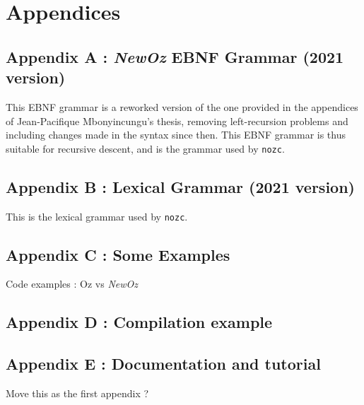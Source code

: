 
\appendix
\chapter*{Appendices}
\renewcommand{\thesection}{\Alph{section}}

\section{Appendix A : \textit{NewOz} EBNF Grammar (2021 version)}\label{sec:appendix-grammar}
This EBNF grammar is a reworked version of the one provided in the appendices of Jean-Pacifique Mbonyincungu's thesis,
removing left-recursion problems and including changes made in the syntax since then.\newline
This EBNF grammar is thus suitable for recursive descent, and is the grammar used by \texttt{nozc}.


\section{Appendix B : Lexical Grammar (2021 version)}\label{sec:appendix-lexical-grammar}
This is the lexical grammar used by \texttt{nozc}.


\section{Appendix C : Some Examples}\label{sec:appendix-examples}
Code examples : Oz vs \textit{NewOz}


\section{Appendix D : Compilation example}\label{sec:appendix-compilation}

\section{Appendix E : Documentation and tutorial}\label{sec:appendix-doc}
Move this as the first appendix ?